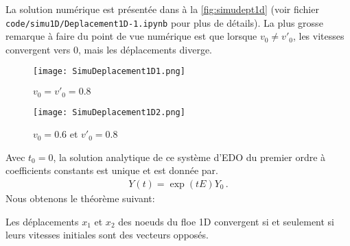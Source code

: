 La solution numérique est présentée dans à la \cref{fig:simudept1d} (voir fichier \verb|code/simu1D/Deplacement1D-1.ipynb| pour plus de détails). La plus grosse remarque à faire du point de vue numérique est que lorsque $v_0 \neq v'_0$, les vitesses convergent vers $0$, mais les déplacements diverge.
\begin{figure*}[!h]
    \centering

    \begin{subfigure}[t]{0.45\textwidth}
        \centering
        \texttt{[image: SimuDeplacement1D1.png]}
        \caption{$v_0=v'_0 = 0.8$}
    \end{subfigure}
    \begin{subfigure}[t]{0.45\textwidth}
        \centering
        \texttt{[image: SimuDeplacement1D2.png]}
        \caption{$v_0= 0.6$ et $v'_0 = 0.8$}
    \end{subfigure}

    \caption{Simulation du déplacement 1D d'un floe avec $m=1$, $k=18$, $\mu=1.3$, $t_{f}=5$. En règle générale, on observe le ralentissement du système et une convergence des déplacements vers l'état d'équilibre $Y_{eq}= (0,0,0,0)$ lorsque $v_0 = v'_0$.}
    \label{fig:simudept1d}
\end{figure*}

Avec $t_0= 0$, la solution analytique de ce système d'EDO du premier ordre à coefficients constants est unique et est donnée par.
\begin{align}
    Y(t) = \exp(tE)Y_0 \,.
\end{align}
Nous obtenons le théorème suivant:
\begin{theorem} \label{th:div1D}
    Les déplacements $x_1$ et $x_2$ des noeuds du floe 1D convergent si et seulement si leurs vitesses initiales sont des vecteurs opposés.
\end{theorem}

